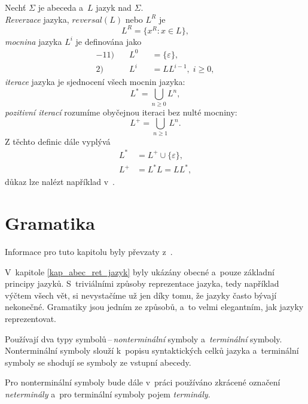 \begin{definition}
    Nechť $\Sigma$ je abeceda a~$L$ jazyk nad $\Sigma$.\\
    \emph{Reverzace} jazyka, $reversal(L)$ nebo $L^R$ je
    \begin{equation*}
        L^R = \{x^R : x \in L\},
    \end{equation*}
    \emph{mocnina} jazyka $L^i$ je definována jako
    \begin{alignat*}{-1}
        \text{1)}& \quad L^0 &&= \{\varepsilon\},\\
        \text{2)}& \quad L^i &&= LL^{i-1},\; i \geq 0,
    \end{alignat*}
    \emph{iterace} jazyka je sjednocení všech mocnin jazyka:
    \begin{equation*}
        L^* = \bigcup_{n \geq 0} L^n,
    \end{equation*}
    \emph{pozitivní iterací} rozumíme obyčejnou iteraci bez nulté mocniny:
    \begin{equation*}
        L^+ = \bigcup_{n \geq 1} L^n.
    \end{equation*}
    Z těchto definic dále vyplývá 
    \begin{align*}
        L^* &= L^+ \cup \{\varepsilon\},\\
        L^+ &= L^*L = LL^*,
    \end{align*}
    důkaz lze nalézt například v~\cite{TIN-opora}.
\end{definition}

\section{Gramatika}

Informace pro tuto kapitolu byly převzaty z~\cite{TIN-opora}.

V~kapitole \ref{kap_abec_ret_jazyk} byly ukázány obecné a~pouze základní principy jazyků.
S~triviálními způsoby reprezentace jazyka, tedy například výčtem všech vět, si nevystačíme už jen díky tomu, že jazyky často bývají nekonečné.
Gramatiky jsou jedním ze způsobů, a~to velmi elegantním, jak jazyky reprezentovat.

Používají dva typy symbolů\,--\,\emph{nonterminální} symboly a~\emph{terminální} symboly.
Nonterminální symboly slouží k~popisu syntaktických celků jazyka a~terminální symboly se shodují se symboly ze vstupní abecedy.

\begin{convention}
    Pro nonterminální symboly bude dále v~práci používáno zkrácené označení \emph{neterminály} a~pro terminální symboly pojem \emph{terminály}.
\end{convention}

